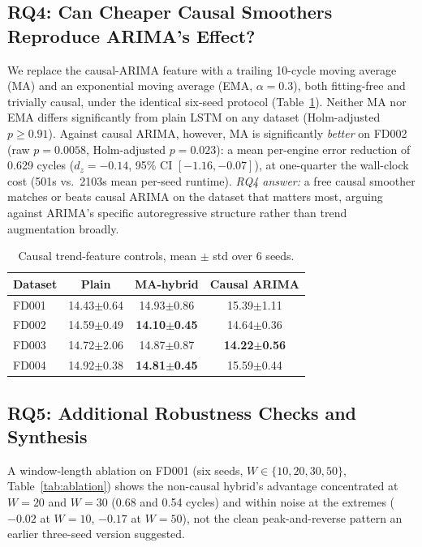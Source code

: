 \documentclass[conference]{IEEEtran}
\begin{document}
\subsection{RQ4: Can Cheaper Causal Smoothers Reproduce ARIMA's Effect?}
We replace the causal-ARIMA feature with a trailing 10-cycle moving average (MA) and an exponential moving average (EMA, $\alpha=0.3$), both fitting-free and trivially causal, under the identical six-seed protocol (Table~\ref{tab:controls}). Neither MA nor EMA differs significantly from plain LSTM on any dataset (Holm-adjusted $p\geq0.91$). Against causal ARIMA, however, MA is significantly \emph{better} on FD002 (raw $p=0.0058$, Holm-adjusted $p=0.023$): a mean per-engine error reduction of 0.629 cycles ($d_z=-0.14$, 95\% CI $[-1.16,-0.07]$), at one-quarter the wall-clock cost (501s vs.\ 2103s mean per-seed runtime). \emph{RQ4 answer:} a free causal smoother matches or beats causal ARIMA on the dataset that matters most, arguing against ARIMA's specific autoregressive structure rather than trend augmentation broadly.

\begin{table}[t]
\centering
\caption{Causal trend-feature controls, mean $\pm$ std over 6 seeds.}
\label{tab:controls}
\footnotesize
\begin{tabular}{lccc}
\toprule
Dataset & Plain & MA-hybrid & Causal ARIMA \\
\midrule
FD001 & 14.43{\tiny$\pm$0.64} & 14.93{\tiny$\pm$0.86} & 15.39{\tiny$\pm$1.11} \\
FD002 & 14.59{\tiny$\pm$0.49} & \textbf{14.10{\tiny$\pm$0.45}} & 14.64{\tiny$\pm$0.36} \\
FD003 & 14.72{\tiny$\pm$2.06} & 14.87{\tiny$\pm$0.87} & \textbf{14.22{\tiny$\pm$0.56}} \\
FD004 & 14.92{\tiny$\pm$0.38} & \textbf{14.81{\tiny$\pm$0.45}} & 15.59{\tiny$\pm$0.44} \\
\bottomrule
\end{tabular}
\end{table}

\subsection{RQ5: Additional Robustness Checks and Synthesis}
A window-length ablation on FD001 (six seeds, $W\in\{10,20,30,50\}$, Table~\ref{tab:ablation}) shows the non-causal hybrid's advantage concentrated at $W{=}20$ and $W{=}30$ (0.68 and 0.54 cycles) and within noise at the extremes ($-0.02$ at $W{=}10$, $-0.17$ at $W{=}50$), not the clean peak-and-reverse pattern an earlier three-seed version suggested.
\end{document}
